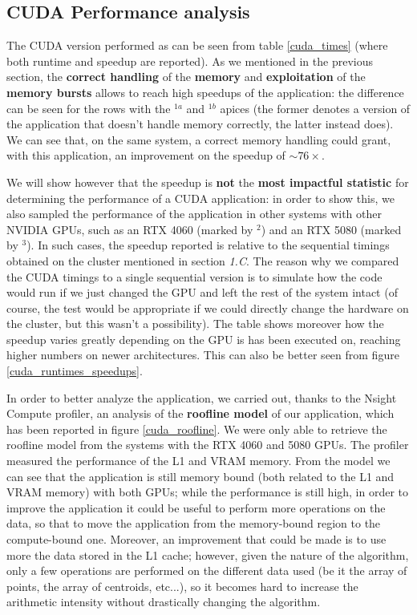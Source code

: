 \documentclass[11pt, journal]{IEEEtran}
\newcommand{\nwl}{

\vspace{11pt}

}
\begin{document}
\subsection{CUDA Performance analysis}

The CUDA version performed as can be seen from table \ref{cuda_times} (where both runtime and speedup are reported). As we mentioned in the previous section, the \textbf{correct handling} of the \textbf{memory} and \textbf{exploitation} of the \textbf{memory bursts} allows to reach high speedups of the application: the difference can be seen for the rows with the \textasteriskcentered$^{1a}$ and \textasteriskcentered$^{1b}$ apices (the former denotes a version of the application that doesn't handle memory correctly, the latter instead does). We can see that, on the same system, a correct memory handling could grant, with this application, an improvement on the speedup of $\sim 76 \times$.
\nwl
We will show however that the speedup is \textbf{not} the \textbf{most impactful statistic} for determining the performance of a CUDA application: in order to show this, we also sampled the performance of the application in other systems with other NVIDIA GPUs, such as an RTX 4060 (marked by \textasteriskcentered$^2$) and an RTX 5080 (marked by \textasteriskcentered$^3$). In such cases, the speedup reported is relative to the sequential timings obtained on the cluster mentioned in section \textit{1.C}. The reason why we compared the CUDA timings to a single sequential version is to simulate how the code would run if we just changed the GPU and left the rest of the system intact (of course, the test would be appropriate if we could directly change the hardware on the cluster, but this wasn't a possibility). The table shows moreover how the speedup varies greatly depending on the GPU is has been executed on, reaching higher numbers on newer architectures. This can also be better seen from figure \ref{cuda_runtimes_speedups}.
\nwl
In order to better analyze the application, we carried out, thanks to the Nsight Compute profiler, an analysis of the \textbf{roofline model} of our application, which has been reported in figure \ref{cuda_roofline}. We were only able to retrieve the roofline model from the systems with the RTX 4060 and 5080 GPUs. The profiler measured the performance of the L1 and VRAM memory. From the model we can see that the application is still memory bound (both related to the L1 and VRAM memory) with both GPUs; while the performance is still high, in order to improve the application it could be useful to perform more operations on the data, so that to move the application from the memory-bound region to the compute-bound one. Moreover, an improvement that could be made is to use more the data stored in the L1 cache; however, given the nature of the algorithm, only a few operations are performed on the different data used (be it the array of points, the array of centroids, etc...), so it becomes hard to increase the arithmetic intensity without drastically changing the algorithm.
\end{document}
